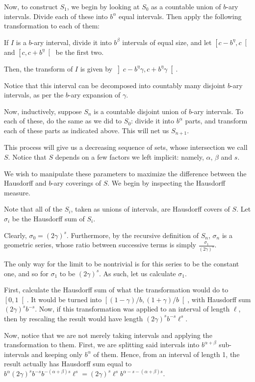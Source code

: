 \documentclass[11pt]{amsart}
\begin{document}
Now, to construct $S_1$, we begin by looking at $S_0$ as a countable union of $b$-ary intervals. Divide each of these into $b^\alpha$ equal intervals. Then apply the following transformation to each of them:

If $I$ is a $b$-ary interval, divide it into $b^\beta$ intervals of equal size, and let $\left[c - b^\eta, c\right[$ and $\left[c, c + b^\eta\right[$ be the first two.

Then, the transform of $I$ is given by $\left] c - b^\eta \gamma, c + b^\eta \gamma \right[$.

Notice that this interval can be decomposed into countably many disjoint $b$-ary intervals, as per the $b$-ary expansion of $\gamma$.

Now, inductively, suppose $S_n$ is a countable disjoint union of $b$-ary intervals. To each of these, do the same as  we did to $S_0$: divide it into $b^\alpha$ parts, and transform each of these parts as indicated above. This will net us $S_{n+1}$.

This process will give us a decreasing sequence of sets, whose intersection we call $S$. Notice that $S$ depends on a few factors we left implicit: namely, $\alpha$, $\beta$ and $s$.

We wish to manipulate these parameters to maximize the difference between the Hausdorff and $b$-ary coverings of $S$. We begin by inspecting the Hausdorff measure.

Note that all of the $S_i$, taken as unions of intervals, are Hausdorff covers of $S$. Let $\sigma_i$ be the Hausdorff sum of $S_i$.

Clearly, $\sigma_0 = (2 \gamma)^s$. Furthermore, by the recursive definition of $S_n$, $\sigma_n$ is a geometric series, whose ratio between successive terms is simply $\frac{\sigma_1}{(2 \gamma)^s}$.

The only way for the limit to be nontrivial is for this series to be the constant one, and so for $\sigma_1$ to be $(2 \gamma)^s$. As such, let us calculate $\sigma_1$.

First, calculate the Hausdorff sum of what the transformation would do to $\left[0, 1 \right[$. It would be turned into $\left[ (1-\gamma)/b, (1+\gamma)/b \right[$, with Hausdorff sum $(2 \gamma)^s b^{-s}$. Now, if this transformation was applied to an interval of length $\ell$, then by rescaling the result would have length $(2 \gamma)^s b^{-s} \ell^s$.

Now, notice that we are not merely taking intervals and applying the transformation to them. First, we are splitting said intervals into $b^{\alpha+\beta}$ sub-intervals and keeping only $b^\alpha$ of them. Hence, from an interval of length 1, the result actually has Hausdorff sum equal to $b^\alpha (2 \gamma)^s b^{-s} b^{-(\alpha + \beta) s} \ell^s = (2 \gamma)^s \ell^s b^{\alpha - s - (\alpha + \beta) s}$.
\end{document}
